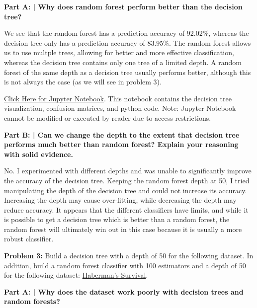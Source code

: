 \documentclass{article}
\begin{document}
 \textbf{Part A: | Why does random forest perform better than the decision tree?}\newline
 
 We see that the random forest has a prediction accuracy of 92.02\%, whereas the decision tree only has a prediction accuracy of 83.95\%. The random forest allows us to use multple trees, allowing for better and more effective classification, whereas the decision tree contains only one tree of a limited depth. A random forest of the same depth as a decision tree usually performs better, although this is not always the case (as we will see in problem 3).
 
 \href{https://colab.research.google.com/drive/1tRECEyVDIe6S6kTx38TVnlEZE0oh4O9J}{Click Here for Jupyter Notebook}. This notebook contains the decision tree visualization, confusion matrices, and python code. Note: Jupyter Notebook cannot be modified or executed by reader due to access restrictions.

 \textbf{Part B: | Can we change the depth to the extent that decision tree performs much better than random forest? Explain your reasoning with solid evidence.}\newline
 
 No. I experimented with different depths and was unable to significantly improve the accuracy of the decision tree. Keeping the random forest depth at 50, I tried manipulating the depth of the decision tree and could not increase its accuracy. Increasing the depth may cause over-fitting, while decreasing the depth may reduce accuracy. It appears that the different classifiers have limits, and while it is possible to get a decision tree which is better than a random forest, the random forest will ultimately win out in this case because it is usually a more robust classifier.
 
 \newpage

 \begin{center}
      \Large\textbf{Problem 3:} Build a decision tree with a depth of 50 for the following dataset. In addition, build a random forest classifier with 100 estimators and a depth of 50 for the following dataset: \href{https://archive.ics.uci.edu/ml/datasets/Haberman's+Survival}{Haberman's Survival}.
      \par
 \end{center}

 \textbf{Part A: | Why does the dataset work poorly with decision trees and random forests?}\newline
 
\end{document}
